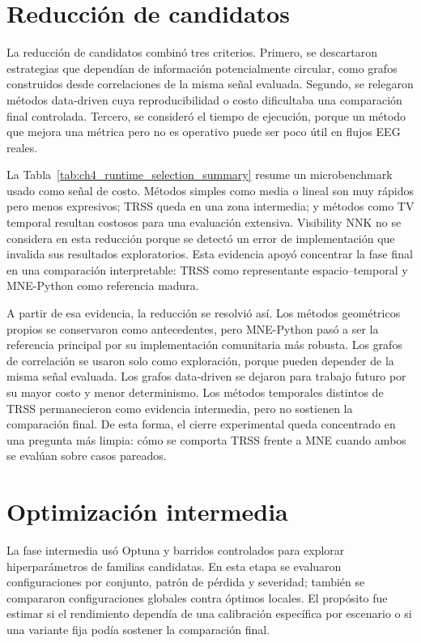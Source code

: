 \section{Reducción de candidatos}

La reducción de candidatos combinó tres criterios. Primero, se descartaron estrategias que dependían de información potencialmente circular, como grafos construidos desde correlaciones de la misma señal evaluada. Segundo, se relegaron métodos data-driven cuya reproducibilidad o costo dificultaba una comparación final controlada. Tercero, se consideró el tiempo de ejecución, porque un método que mejora una métrica pero no es operativo puede ser poco útil en flujos EEG reales.

La Tabla~\ref{tab:ch4_runtime_selection_summary} resume un microbenchmark usado como señal de costo. Métodos simples como media o lineal son muy rápidos pero menos expresivos; TRSS queda en una zona intermedia; y métodos como TV temporal resultan costosos para una evaluación extensiva. Visibility NNK no se considera en esta reducción porque se detectó un error de implementación que invalida sus resultados exploratorios. Esta evidencia apoyó concentrar la fase final en una comparación interpretable: TRSS como representante espacio--temporal y MNE-Python como referencia madura.


A partir de esa evidencia, la reducción se resolvió así. Los métodos geométricos propios se conservaron como antecedentes, pero MNE-Python pasó a ser la referencia principal por su implementación comunitaria más robusta. Los grafos de correlación se usaron solo como exploración, porque pueden depender de la misma señal evaluada. Los grafos data-driven se dejaron para trabajo futuro por su mayor costo y menor determinismo. Los métodos temporales distintos de TRSS permanecieron como evidencia intermedia, pero no sostienen la comparación final. De esta forma, el cierre experimental queda concentrado en una pregunta más limpia: cómo se comporta TRSS frente a MNE cuando ambos se evalúan sobre casos pareados.

\section{Optimización intermedia}

La fase intermedia usó Optuna y barridos controlados para explorar hiperparámetros de familias candidatas. En esta etapa se evaluaron configuraciones por conjunto, patrón de pérdida y severidad; también se compararon configuraciones globales contra óptimos locales. El propósito fue estimar si el rendimiento dependía de una calibración específica por escenario o si una variante fija podía sostener la comparación final.


